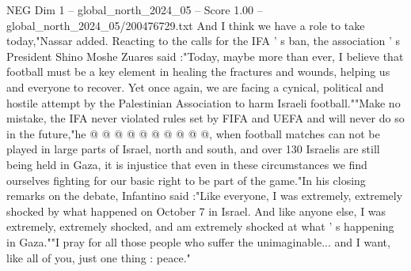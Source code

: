 \begin{textsample}{NEG Dim 1 – global\_north\_2024\_05 – Score 1.00 – global\_north\_2024\_05/200476729.txt}
And I think we have a role to take today,"Nassar added.
Reacting to the calls for the IFA ' s ban, the association ' s President Shino Moshe Zuares said :"Today, maybe more than ever, I believe that football must be a key element in healing the fractures and wounds, helping us and everyone to recover.
Yet once again, we are facing a cynical, political and hostile attempt by the Palestinian Association to harm Israeli football.""Make no mistake, the IFA never violated rules set by FIFA and UEFA and will never do so in the future,"he @ @ @ @ @ @ @ @ @ @, when football matches can not be played in large parts of Israel, north and south, and over 130 Israelis are still being held in Gaza, it is injustice that even in these circumstances we find ourselves fighting for our basic right to be part of the game."In his closing remarks on the debate, Infantino said :"Like everyone, I was extremely, extremely shocked by what happened on October 7 in Israel.
And like anyone else, I was extremely, extremely shocked, and am extremely shocked at what ' s happening in Gaza.""I pray for all those people who suffer the unimaginable... and I want, like all of you, just one thing : peace."

\end{textsample}

